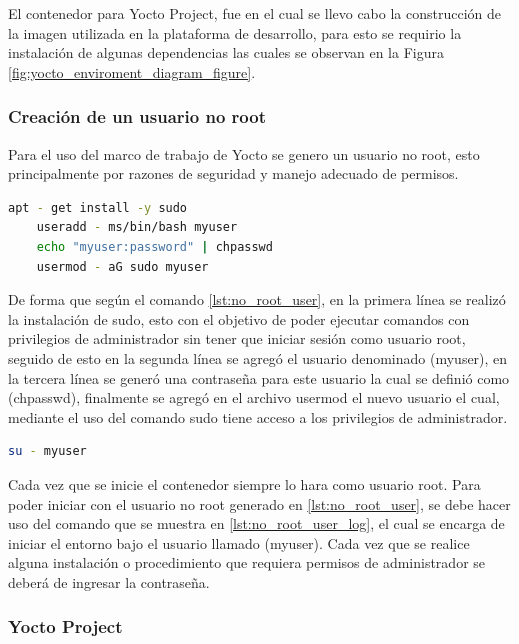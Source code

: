 El contenedor para Yocto Project, fue en el cual se llevo cabo la construcción de la imagen utilizada en la plataforma de desarrollo, para esto se requirio la instalación de algunas dependencias las cuales se observan en la Figura \ref{fig:yocto_enviroment_diagram_figure}.



\subsubsection{Creación de un usuario no root}

Para el uso del marco de trabajo de Yocto se genero un usuario no root, esto principalmente por razones de seguridad y manejo adecuado de permisos.

\begin{lstlisting}[language=bash, caption={Generacion de usuario no root, Linux}, label=lst:no_root_user]
    apt - get install -y sudo
    useradd - ms/bin/bash myuser
    echo "myuser:password" | chpasswd
    usermod - aG sudo myuser
\end{lstlisting}

De forma que según el comando \ref{lst:no_root_user}, en la primera línea se realizó la instalación de sudo, esto con el objetivo de poder ejecutar comandos con privilegios de administrador sin tener que iniciar sesión como usuario root, seguido de esto en la segunda línea se agregó el usuario denominado (myuser), en la tercera línea se generó una contraseña para este usuario la cual se definió como (chpasswd), finalmente se agregó en el archivo usermod el nuevo usuario el cual, mediante el uso del comando sudo tiene acceso a los privilegios de administrador. 

\begin{lstlisting}[language=bash, caption={Iniciar usuario no root, Linux}, label=lst:no_root_user_log]
    su - myuser
\end{lstlisting}

Cada vez que se inicie el contenedor siempre lo hara como usuario root. Para poder iniciar con el usuario no root generado en \ref{lst:no_root_user}, se debe hacer uso del comando que se muestra en \ref{lst:no_root_user_log}, el cual se encarga de iniciar el entorno bajo el usuario llamado (myuser). Cada vez que se realice alguna instalación o procedimiento que requiera permisos de administrador se deberá de ingresar la contraseña.

\subsubsection{Yocto Project}

